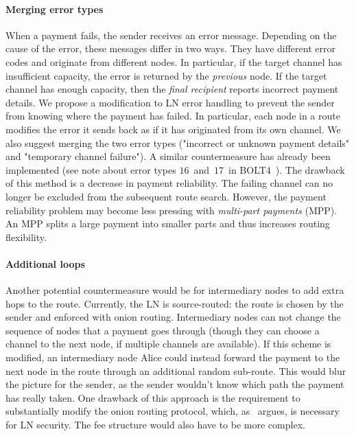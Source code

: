 \paragraph{Merging error types}
When a payment fails, the sender receives an error message.
Depending on the cause of the error, these messages differ in two ways.
They have different error codes and originate from different nodes.
In particular, if the target channel has insufficient capacity, the error is returned by the \textit{previous} node.
If the target channel has enough capacity, then the \textit{final recipient} reports incorrect payment details.
We propose a modification to LN error handling to prevent the sender from knowing where the payment has failed.
In particular, each node in a route modifies the error it sends back as if it has originated from its own channel.
We also suggest merging the two error types ("incorrect or unknown payment details" and "temporary channel failure").
A similar countermeasure has already been implemented (see note about error types $16$~and~$17$~in BOLT4~\cite{Bolt4OnionRouting}).
The drawback of this method is a decrease in payment reliability.
The failing channel can no longer be excluded from the subsequent route search.
However, the payment reliability problem may become less pressing with \textit{multi-part payments} (MPP).
An MPP splits a large payment into smaller parts and thus increases routing flexibility.

\paragraph{Additional loops}
Another potential countermeasure would be for intermediary nodes to add extra hops to the route.
Currently, the LN is source-routed: the route is chosen by the sender and enforced with onion routing.
Intermediary nodes can not change the sequence of nodes that a payment goes through (though they can choose a channel to the next node, if multiple channels are available).
If this scheme is modified, an intermediary node Alice could instead forward the payment to the next node in the route through an additional random sub-route.
This would blur the picture for the sender, as the sender wouldn't know which path the payment has really taken.
One drawback of this approach is the requirement to substantially modify the onion routing protocol, which, as~\cite{Malavolta2019} argues, is necessary for LN security.
The fee structure would also have to be more complex.

